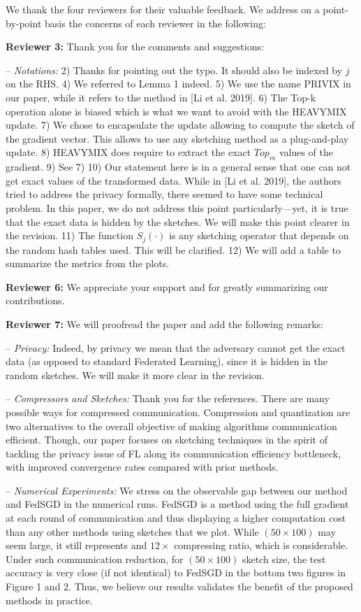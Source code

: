 \documentclass{article}
\begin{document}
We thank the four reviewers for their valuable feedback. 
We address on a point-by-point basis the concerns of each reviewer in the following:


\textbf{Reviewer 3:} Thank you for the comments and suggestions:\vspace{-5pt}

-- \textit{Notations:} 
2) Thanks for pointing out the typo. It should also be indexed by $j$ on the RHS.
4) We referred to Lemma 1 indeed.
5) We use the name PRIVIX in our paper, while it refers to the method in [Li et al. 2019].
6) The Top-k operation alone is biased which is what we want to avoid with the HEAVYMIX update.
7) We chose to encapsulate the update allowing to compute the sketch of the gradient vector. This allows to use any sketching method as a plug-and-play update.
8) HEAVYMIX does require to extract the exact $Top_m$ values of the gradient.
9) See 7)
10) Our statement here is in a general sense that one can not get exact values of the transformed data. While in [Li et al. 2019], the authors tried to address the privacy formally, there seemed to have some technical problem. In this paper, we do not address this point particularly---yet, it is true that the exact data is hidden by the sketches. We will make this point clearer in the revision.
11) The function $S_j(\cdot)$ is any sketching operator that depends on the random hash tables used. This will be clarified.
12) We will add a table to summarize the metrics from the plots.

\textbf{Reviewer 6:} We appreciate your support and for greatly summarizing our contributions.


\textbf{Reviewer 7:} We will proofread the paper and add the following remarks:

-- \textit{Privacy:} Indeed, by privacy we mean that the adversary cannot get the exact data (as opposed to standard Federated Learning), since it is hidden in the random sketches. We will make it more clear in the revision.

-- \textit{Compressors and Sketches:} Thank you for the references.
There are many possible ways for compressed communication. 
Compression and quantization are two alternatives to the overall objective of making algorithms communication efficient.
Though, our paper focuses on sketching techniques in the spirit of tackling the privacy issue of FL along its communication efficiency bottleneck, with improved convergence rates compared with prior methods.


-- \textit{Numerical Experiments:} 
We stress on the observable gap between our method and FedSGD in the numerical runs. FedSGD is a method using the full gradient at each round of communication and thus displaying a higher computation cost than any other methods using sketches that we plot.
While $(50 \times 100)$ may seem large, it still represents and $12 \times$ compressing ratio, which is considerable. 
Under such communication reduction, for $(50 \times 100)$ sketch size, the test accuracy is very close (if not identical) to FedSGD in the bottom two figures in Figure 1 and 2. Thus, we believe our results validates the benefit of the proposed methods in practice.
\end{document}
